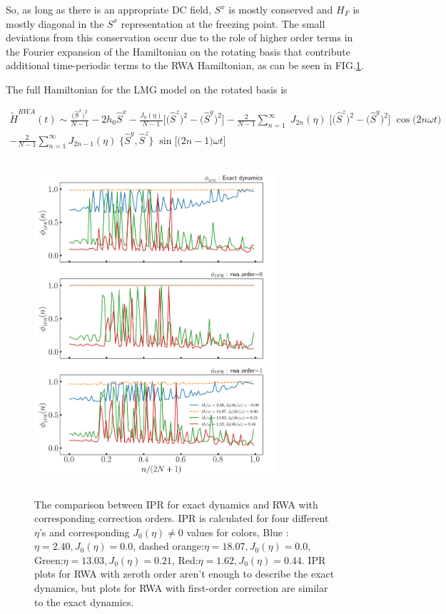 \documentclass[%
reprint,
superscriptaddress,
amsmath,amssymb,
aps,
prb,
]{revtex4-2}
\begin{document}
	So, as long as there is an appropriate DC field, $S^x$ is mostly conserved and $H_F$ is mostly diagonal in the $S^x$ representation at the freezing point. The small deviations from this conservation occur due to the role of higher order terms in the Fourier expansion of the Hamiltonian on the rotating basis that contribute additional time-periodic terms to the RWA Hamiltonian, as can be seen in FIG.\ref{lmg_ipr_rwa11}.
	
	The full Hamiltonian for the LMG model on the rotated basis is
	\begin{widetext}
		\begin{multline}
			\tilde{H}^{RWA}(t)\sim \frac{\big(\hat{S}^x\big)^{2}}{N-1} - 2h_0 \hat{S}^x - \frac{J_0(\eta)}{N-1}\bigg[\big(\hat{S}^z\big)^{2} - \big(\hat{S}^y\big)^{2} \bigg] - \frac{2}{N-1}\sum^\infty_{n=1}\;J_{2n}(\eta)\;\Big[\big( \hat{S}^z\big)^2 - \big( \hat{S}^y\big)^2\Big]\;\cos{\big(2n\omega t\big)}\\
			- \frac{2}{N-1}\sum^\infty_{n=1}J_{2n-1}(\eta)\;\big\{ \hat{S}^y,  \hat{S}^z \big\}  \;\sin{\Big[\big(2n-1\big)\omega t\Big]}
		\end{multline}
	\end{widetext}
	
	\begin{figure}[ht!]
		\centering
		\includegraphics[height = 12.0cm, width =9.0cm]{comprasion_LMG_50_highFr90_exact_nd_rwa.jpeg}
		\label{lmg_ipr_rwa11}
		\caption{The comparison between IPR for exact dynamics and RWA with corresponding correction orders. IPR is calculated for four different $\eta$'s and corresponding $J_0(\eta)\neq 0$ values for colors, Blue :$\eta = 2.40, J_0(\eta) = 0.0$, dashed orange:$\eta = 18.07, J_0(\eta) = 0.0$, Green:$\eta =13.03, J_0(\eta) = 0.21$, Red:$\eta = 1.62, J_0(\eta)= 0.44$. IPR plots for RWA with zeroth order aren't enough to describe the exact dynamics, but plots for RWA with first-order correction are similar to the exact dynamics.}
	\end{figure}
	
\end{document}
